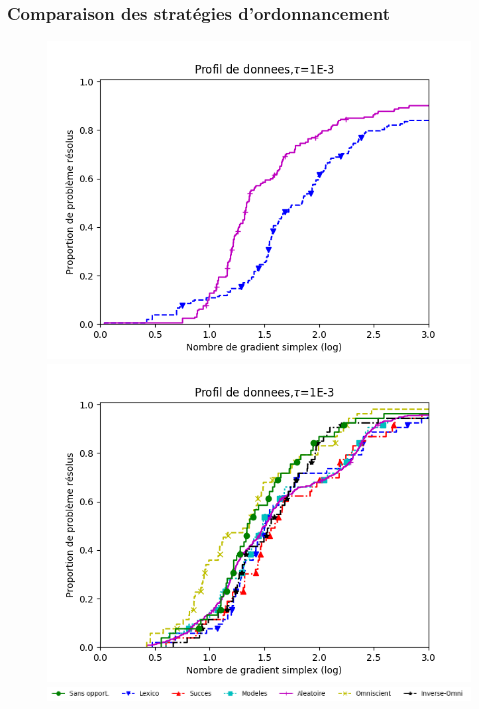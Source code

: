 \documentclass{beamer}
\begin{document}
\begin{frame}
\frametitle{Comparaison des stratégies d'ordonnancement}
\noindent
\begin{center}
\begin{figure}
\vspace{-1em}
\begin{minipage}[t]{0.5\linewidth}
\includegraphics[width=\linewidth]{gss.png}
\end{minipage}%
\hfill%
\begin{minipage}[t]{0.5\linewidth}
\includegraphics[width=\linewidth]{imfil.png}
\end{minipage}
\includegraphics[width=\linewidth]{legende_mw.png}

\end{figure}
\end{center}
\end{frame}
\end{document}
